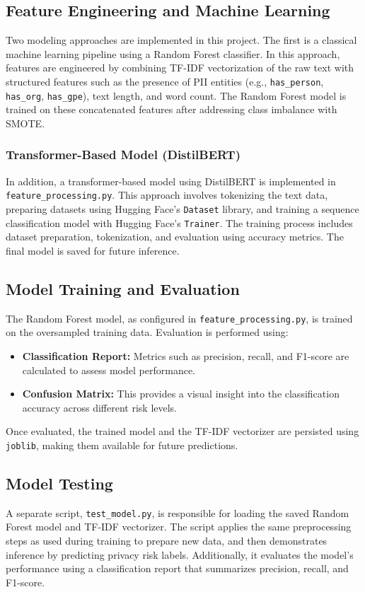 \documentclass{article}
\begin{document}
\subsection{Feature Engineering and Machine Learning}
Two modeling approaches are implemented in this project. The first is a classical machine learning pipeline using a Random Forest classifier. In this approach, features are engineered by combining TF-IDF vectorization of the raw text with structured features such as the presence of PII entities (e.g., \texttt{has\_person}, \texttt{has\_org}, \texttt{has\_gpe}), text length, and word count. The Random Forest model is trained on these concatenated features after addressing class imbalance with SMOTE.

\subsubsection{Transformer-Based Model (DistilBERT)}
In addition, a transformer-based model using DistilBERT is implemented in \texttt{feature\_processing.py}. This approach involves tokenizing the text data, preparing datasets using Hugging Face's \texttt{Dataset} library, and training a sequence classification model with Hugging Face’s \texttt{Trainer}. The training process includes dataset preparation, tokenization, and evaluation using accuracy metrics. The final model is saved for future inference.

\subsection{Model Training and Evaluation}
The Random Forest model, as configured in \texttt{feature\_processing.py}, is trained on the oversampled training data. Evaluation is performed using:
\begin{itemize}
    \item \textbf{Classification Report:} Metrics such as precision, recall, and F1-score are calculated to assess model performance.
    \item \textbf{Confusion Matrix:} This provides a visual insight into the classification accuracy across different risk levels.
\end{itemize}
Once evaluated, the trained model and the TF-IDF vectorizer are persisted using \texttt{joblib}, making them available for future predictions.

\subsection{Model Testing}
A separate script, \texttt{test\_model.py}, is responsible for loading the saved Random Forest model and TF-IDF vectorizer. The script applies the same preprocessing steps as used during training to prepare new data, and then demonstrates inference by predicting privacy risk labels. Additionally, it evaluates the model's performance using a classification report that summarizes precision, recall, and F1-score.
\end{document}
